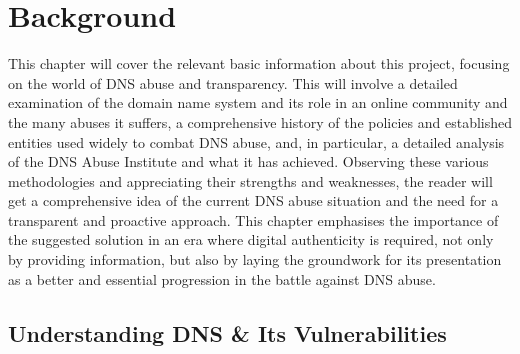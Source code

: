 \chapter{Background}
\label{Chapt2}


This chapter will cover the relevant basic information about this project, focusing on the world of DNS abuse and transparency. This will involve a detailed examination of the domain name system and its role in an online community and the many abuses it suffers, a comprehensive history of the policies and established entities used widely to combat DNS abuse, and, in particular, a detailed analysis of the DNS Abuse Institute and what it has achieved. Observing these various methodologies and appreciating their strengths and weaknesses, the reader will get a comprehensive idea of the current DNS abuse situation and the need for a transparent and proactive approach. This chapter emphasises the importance of the suggested solution in an era where digital authenticity is required, not only by providing information, but also by laying the groundwork for its presentation as a better and essential progression in the battle against DNS abuse.

\section{Understanding DNS \& Its Vulnerabilities}

